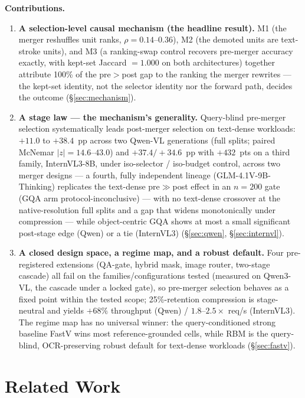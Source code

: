 \documentclass[sigconf,review,anonymous]{acmart}
\begin{document}
\textbf{Contributions.}
\begin{enumerate}
  \item \textbf{A selection-level causal mechanism (the headline result).}
    M1 (the merger reshuffles unit ranks, $\rho = 0.14$--$0.36$), M2 (the
    demoted units are text-stroke units), and M3 (a ranking-swap control
    recovers pre-merger accuracy exactly, with kept-set Jaccard $= 1.000$ on
    both architectures) together attribute 100\% of the pre$>$post gap to the
    ranking the merger rewrites --- the kept-set identity, not the selector
    identity nor the forward path, decides the outcome
    (\S\ref{sec:mechanism}).
  \item \textbf{A stage law --- the mechanism's generality.} Query-blind
    pre-merger selection systematically leads post-merger selection on
    text-dense workloads: $+11.0$ to $+38.4$~pp across two Qwen-VL generations
    (full splits; paired McNemar $|z| = 14.6$--$43.0$) and $+37.4 / +34.6$~pp
    with $+432$~pts on a third family, InternVL3-8B, under iso-selector /
    iso-budget control, across two merger designs --- a fourth, fully
    independent lineage (GLM-4.1V-9B-Thinking) replicates the text-dense
    pre$\gg$post effect in an $n = 200$ gate (GQA arm protocol-inconclusive)
    --- with no text-dense crossover at the native-resolution full splits and
    a gap that widens monotonically under compression --- while
    object-centric GQA shows at most
    a small significant post-stage edge (Qwen) or a tie (InternVL3)
    (\S\ref{sec:qwen}, \S\ref{sec:internvl}).
  \item \textbf{A closed design space, a regime map, and a robust default.}
    Four pre-registered extensions (QA-gate, hybrid mask, image router,
    two-stage cascade) all fail on the families/configurations tested
    (measured on Qwen3-VL, the cascade under a locked gate), so pre-merger
    selection behaves as a fixed point within the tested scope;
    25\%-retention compression is stage-neutral and yields $+68\%$ throughput
    (Qwen) / $1.8$--$2.5\times$ req/s (InternVL3). The regime map has no
    universal winner: the query-conditioned strong baseline
    FastV wins most reference-grounded cells, while RBM is the
    query-blind, OCR-preserving robust default for text-dense workloads
    (\S\ref{sec:fastv}).
\end{enumerate}

\section{Related Work}\label{sec:related}
\end{document}
